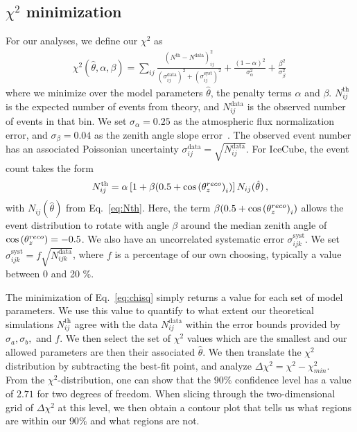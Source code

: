 \subsection{$\chi^2$ minimization}
For our analyses, we define our $\chi^2$ as
\begin{align} \label{eq:chisq}
    \chi^{2}(\hat{\theta},\alpha,\beta)=\sum_{ij} \frac{\left(N^\text{th}-N^\text{data}\right)_{ij}^{2}}
    {\left(\sigma^\text{data}_{ij}\right)^{2} + \left(\sigma^\text{syst}_{ij}\right)^{2}}+ 
    \frac{(1-\alpha)^2}{\sigma_\alpha^2} + \frac{\beta^2}{\sigma_\beta^2}\,
\end{align}
where we minimize over the model parameters $\hat{\theta}$, the penalty terms $\alpha$ and $\beta$.
$N_{ij}^\text{th}$ is the expected number of events from theory, and $N_{ij}^\text{data}$ is the observed number of events in that bin. 
We set $\sigma_\alpha = 0.25$ as the atmospheric flux normalization error, and $\sigma_\beta = 0.04$ as the zenith angle slope error~\cite{hondapaper}. 
The observed event number has an associated Poissonian uncertainty $\sigma_{ij}^\text{data} = \sqrt{N_{ij}^\text{data}}$.
For IceCube, the event count takes the form
\begin{align}
    N^\text{th}_{ij} = \alpha\left[1+\beta (0.5 + \cos{(\theta_z^{reco})}_i )\right] N_{ij}(\hat{\theta})\,,
\end{align}
with $N_{ij}(\hat{\theta})$ from Eq.~\ref{eq:Nth}. Here, the term $ \beta (0.5 + \cos{(\theta_z^{reco})}_i )$ allows the event distribution to rotate with angle $\beta$ around the median zenith angle of $\cos{(\theta_z^{reco})} = -0.5$.
We also have an uncorrelated systematic error $\sigma_{ijk}^\text{syst}$. We set $\sigma_{ijk}^\text{syst} = f\sqrt{N_{ijk}^\text{data}}$, where $f$ is a percentage of our own choosing,
typically a value between 0 and 20 \%.

The minimization of Eq.~\ref{eq:chisq} simply returns a value for each set of model parameters. We use this value to quantify to what extent
our theoretical simulations $N^\text{th}_{ij}$ agree with the data $N^\text{data}_{ij}$ within the error bounds provided by $\sigma_a,\sigma_b,$ and $f$.
We then select the set of $\chi^2$ values which are the smallest and our allowed parameters are then their associated $\hat{\theta}$.
We then translate the $\chi^2$ distribution by subtracting the best-fit point, and analyze $\Delta \chi^2 = \chi^2 - \chi^2_{min}$.
From the $\chi^2$-distribution, one can show that the $90\%$ confidence level has a value of $2.71$ for two degrees of freedom. When slicing through the 
two-dimensional grid of $\Delta \chi^2$ at this level, we then obtain a contour plot that tells us what regions are within our $90 \%$ and what regions are not.

